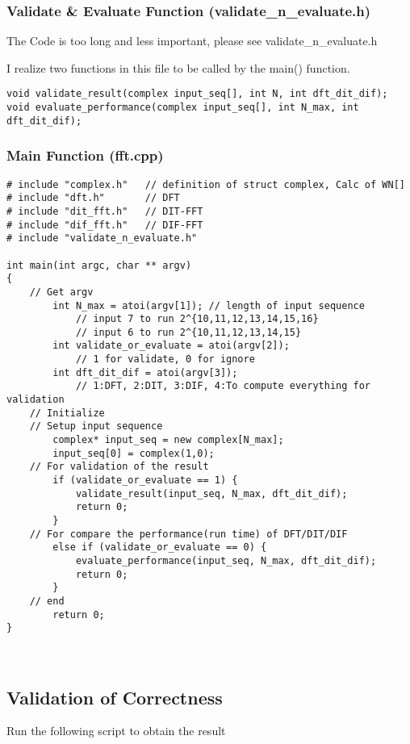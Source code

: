 \documentclass[UTF8,a4paper]{ctexart}
\begin{document}
\newpage
	\subsubsection{Validate \& Evaluate Function (validate\_n\_evaluate.h)}

	The Code is too long and less important, please see validate\_n\_evaluate.h

	I realize two functions in this file to be called by the main() function.

    \begin{lstlisting}
void validate_result(complex input_seq[], int N, int dft_dit_dif);
void evaluate_performance(complex input_seq[], int N_max, int dft_dit_dif);
    \end{lstlisting}


	\subsubsection{Main Function (fft.cpp)}
    \begin{lstlisting}
# include "complex.h"	// definition of struct complex, Calc of WN[]
# include "dft.h"		// DFT
# include "dit_fft.h"	// DIT-FFT
# include "dif_fft.h"	// DIF-FFT
# include "validate_n_evaluate.h"

int main(int argc, char ** argv) 
{
	// Get argv
		int N_max = atoi(argv[1]); // length of input sequence
			// input 7 to run 2^{10,11,12,13,14,15,16}
			// input 6 to run 2^{10,11,12,13,14,15}
		int validate_or_evaluate = atoi(argv[2]); 
			// 1 for validate, 0 for ignore
		int dft_dit_dif = atoi(argv[3]); 
			// 1:DFT, 2:DIT, 3:DIF, 4:To compute everything for validation
	// Initialize
	// Setup input sequence
		complex* input_seq = new complex[N_max];
		input_seq[0] = complex(1,0);
	// For validation of the result
		if (validate_or_evaluate == 1) {
			validate_result(input_seq, N_max, dft_dit_dif);
			return 0;
		}
	// For compare the performance(run time) of DFT/DIT/DIF
		else if (validate_or_evaluate == 0) {
			evaluate_performance(input_seq, N_max, dft_dit_dif);
			return 0;
		}
	// end
	    return 0;
}



    \end{lstlisting}

   
\newpage
\subsection{Validation of Correctness}


Run the following script to obtain the result
\end{document}
